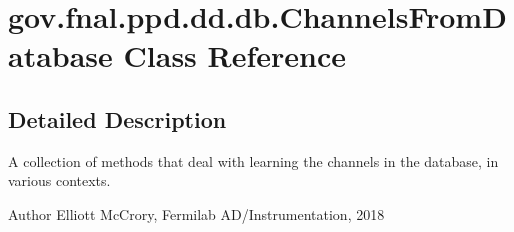 \hypertarget{classgov_1_1fnal_1_1ppd_1_1dd_1_1db_1_1ChannelsFromDatabase}{\section{gov.\-fnal.\-ppd.\-dd.\-db.\-Channels\-From\-Database Class Reference}
\label{classgov_1_1fnal_1_1ppd_1_1dd_1_1db_1_1ChannelsFromDatabase}
}


\subsection{Detailed Description}
A collection of methods that deal with learning the channels in the database, in various contexts.

\begin{DoxyAuthor}{Author}
Elliott Mc\-Crory, Fermilab A\-D/\-Instrumentation, 2018 
\end{DoxyAuthor}
